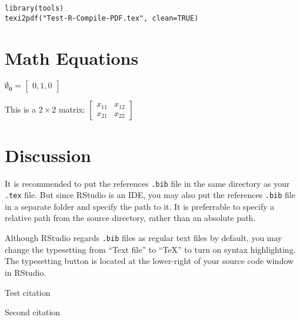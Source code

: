 \documentclass{article}
\begin{document}
\begin{verbatim}
library(tools)
texi2pdf("Test-R-Compile-PDF.tex", clean=TRUE)
\end{verbatim}

\section{Math Equations}

\(\mathbf{\emptyset_0} =\begin{bmatrix}0,1,0\end{bmatrix}\)

This is a $2 \times 2$ matrix: $\begin{bmatrix} x_{11} & x_{12}\\ x_{21} & x_{22} \end{bmatrix}$

\section{Discussion}

It is recommended to put the references \texttt{.bib} file in the same directory as your \texttt{.tex} file. But since RStudio is an IDE, you may also put the references \texttt{.bib} file in a separate folder and specify the path to it. It is preferrable to specify a relative path from the source directory, rather than an absolute path.

Although RStudio regards \texttt{.bib} files as regular text files by default, you may change the typesetting from ``Text file'' to ``TeX'' to turn on syntax highlighting. The typesetting button is located at the lower-right of your source code window in RStudio.

Test citation~\cite{chai-2023-rss-climate}

Second citation~\cite{wilkinson2013grammar}




\end{document}
